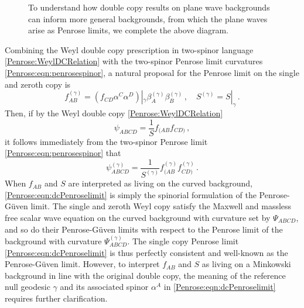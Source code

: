 \begin{figure}[H]
	\caption{To understand how double copy results on plane wave backgrounds can inform more general
		backgrounds, from which the plane waves arise as Penrose limits, we complete the above diagram.}\label{Penrose:fig:schematicquestion}
\end{figure}

Combining the Weyl double copy prescription in two-spinor language \eqref{Penrose:WeylDCRelation} with the two-spinor Penrose limit curvatures \eqref{Penrose:eqn:penrosespinor}, a natural proposal for the Penrose limit on the single and zeroth copy is
\begin{equation}\label{Penrose:eqn:dcPenroselimit}
f^{(\gamma)}_{AB} = \left(f_{CD}\alpha^C \alpha^D \right)|_{\gamma} \beta^{(\gamma)}_A  \beta^{(\gamma)}_B   \, , \quad S^{(\gamma)} = S|_{\gamma} \, .
\end{equation}
Then, if by the Weyl double copy \eqref{Penrose:WeylDCRelation}
\begin{equation}
\psi_{ABCD} = \frac{1}{S} f_{(AB} f_{CD)} \, ,
\end{equation}
it follows immediately from the two-spinor Penrose limit \eqref{Penrose:eqn:penrosespinor} that
\begin{equation}
\psi^{(\gamma)}_{ABCD} = \frac{1}{S^{(\gamma)}} f^{(\gamma)}_{(AB} f^{(\gamma)}_{CD)}  \, .
\end{equation}
When $f_{AB}$ and $S$ are interpreted as living on the curved background, \eqref{Penrose:eqn:dcPenroselimit} is simply the spinorial formulation of the Penrose-G\"uven limit. The single and zeroth Weyl copy satisfy the Maxwell and massless free scalar wave equation on the curved background with curvature set by $\Psi_{ABCD}$, and so do their Penrose-G\"uven limits with respect to the Penrose limit of the background with curvature $\Psi^{(\gamma)}_{ABCD}$. The single copy Penrose limit \eqref{Penrose:eqn:dcPenroselimit} is thus perfectly consistent and well-known as the Penrose-G\"uven limit. However, to interpret $f_{AB}$ and $S$ as living on a Minkowski background in line with the original double copy, the meaning of the reference null geodesic $\gamma$ and its associated spinor $\alpha^A$ in \eqref{Penrose:eqn:dcPenroselimit} requires further clarification. 

